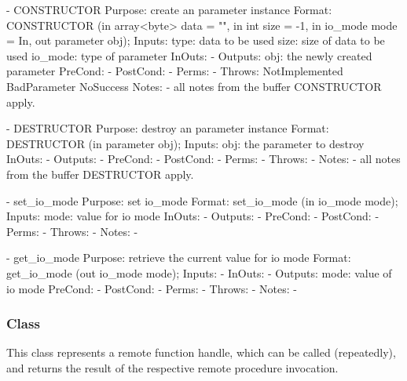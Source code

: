  
 \begin{myspec}
    - CONSTRUCTOR
      Purpose:  create an parameter instance
      Format:   CONSTRUCTOR          (in  array<byte> data = "",
                                      in  int         size = -1,
                                      in  io_mode     mode = In,
                                      out parameter       obj);
      Inputs:   type:                 data to be used
                size:                 size of data to be used
                io_mode:              type of parameter
      InOuts:   -
      Outputs:  obj:                  the newly created parameter 
      PreCond:  -
      PostCond: -
      Perms:    - 
      Throws:   NotImplemented
                BadParameter
                NoSuccess
      Notes:    - all notes from the buffer CONSTRUCTOR apply.
 
 
    - DESTRUCTOR
      Purpose:  destroy an parameter instance
      Format:   DESTRUCTOR           (in  parameter obj);
      Inputs:   obj:                  the parameter to destroy
      InOuts:   -
      Outputs:  -
      PreCond:  -
      PostCond: -
      Perms:    - 
      Throws:   - 
      Notes:    - all notes from the buffer DESTRUCTOR apply.
 
 
    - set_io_mode
      Purpose:  set io_mode
      Format:   set_io_mode          (in  io_mode mode);
      Inputs:   mode:                 value for io mode
      InOuts:   -
      Outputs:  -
      PreCond:  -
      PostCond: -
      Perms:    - 
      Throws:   -
      Notes:    - 
 
    - get_io_mode
      Purpose:  retrieve the current value for io mode
      Format:   get_io_mode          (out io_mode mode);
      Inputs:   -
      InOuts:   -
      Outputs:  mode:                 value of io mode
      PreCond:  -
      PostCond: -
      Perms:    - 
      Throws:   -
      Notes:    -
 \end{myspec}
 
 
  \subsubsection*{Class }
 
    This class represents a remote function handle, which can be
    called (repeatedly), and returns the result of the
    respective remote procedure invocation.  
    
